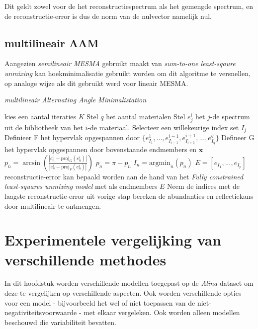 \documentclass[12pt]{report}
\newcommand{\proj}[2]{\text{proj}_{#2}\left(#1\right)}
\begin{document}
Dit geldt zowel voor de het reconstructiespectrum als het gemengde spectrum, en de reconstructie-error is dus de norm van de nulvector namelijk nul.
 

\section{multilineair AAM} \label{sec:MAAM}

Aangezien \textit{semilineair MESMA} gebruikt maakt van \textit{sum-to-one least-sqaure unmixing} kan hoekminimalisatie gebruikt worden om dit algoritme te versnellen, op analoge wijze als dit gebruikt werd voor lineair MESMA.  

\begin{algorithm}
\caption{\textit{multilineair Alternating Angle Minimalistation} \label{al:MAAM}}
\begin{algorithmic}[1]
\State kies een aantal iteraties $K$
\State Stel $q$ het aantal materialen
\State Stel $e_j^i$ het $j$-de spectrum uit de bibliotheek van het $i$-de materiaal.
\State Selecteer een willekeurige index set $I_j$
\State Definieer F het hypervlak opgespannen door $\{e^1_{I_1},...,e^{i-1}_{I_{i-1}},e^{i+1}_{I_{i+1}},...,e^q_{I_q}\}$
\State Defineer G het hypervlak opgespannen door bovenstaande endmembers en $\bm{x}$
\State $p_n = \arcsin \left(\frac{\left|e^i_n - \proj{e^i_n}{G}\right|}{\left|e^i_n - \proj{e^i_n}{F}\right|}\right)$
\If {$(e^i_n - \proj{e^i_n}{F}) \dot (x - proj{x}{F}) < 0$}
\State $p_n = \pi - p_n$
\EndIf
\EndFor
\EndFor
\State $I_n = \text{argmin}_n\left(p_n\right)$
\EndFor
\State $E = [e_{I_1},...,e_{I_p}]$
\State reconstructie-error kan bepaald worden aan de hand van het \textit{Fully constrained
least-squares unmixing model} met als endmembers $E$
\EndFor
\State Neem de indices met de laagste reconstructie-error uit vorige stap
\State bereken de abundanties en reflectiekans door multilineair te ontmengen. 
\end{algorithmic}
\end{algorithm}

\chapter{Experimentele vergelijking van verschillende methodes}

In dit hoofdstuk worden verschillende modellen toegepast op de \textit{Alina}-dataset om deze te vergelijken op verschillende aspecten. Ook worden verschillende opties voor een model - bijvoorbeeld het wel of niet toepassen van de niet-negativiteitsvoorwaarde - met elkaar vergeleken. Ook worden alleen modellen beschouwd die variabiliteit bevatten. 
\end{document}
